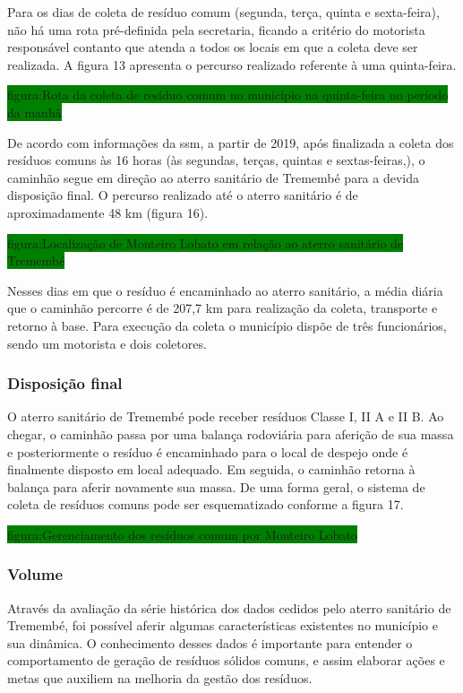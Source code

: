 	Para os dias de coleta de resíduo comum (segunda, terça, quinta e sexta-feira), não há uma rota pré-definida pela secretaria, ficando a critério do motorista responsável contanto que atenda a todos os locais em que a coleta deve ser realizada. A figura 13 apresenta o percurso realizado referente à uma quinta-feira.
	
	\colorbox{green}{figura:Rota da coleta de resíduo comum no município na quinta-feira no período da manhã}
	
	De acordo com informações da \gls{ssm}, a partir de 2019, após finalizada a coleta dos resíduos comuns às 16 horas (às segundas, terças, quintas e sextas-feiras,), o caminhão segue em direção ao aterro sanitário de Tremembé para a devida disposição final. O percurso realizado até o aterro sanitário é de aproximadamente 48 km (figura 16).
	
	\colorbox{green}{figura:Localização de Monteiro Lobato em relação ao aterro sanitário de Tremembé}
	
	Nesses dias em que o resíduo é encaminhado ao aterro sanitário, a média diária que o caminhão percorre é de 207,7 km para realização da coleta, transporte e retorno à base. Para execução da coleta o município dispõe de três funcionários, sendo um motorista e dois coletores.
	
	\subsubsection{Disposição final}
	
	O aterro sanitário de Tremembé pode receber resíduos Classe I, II A e II B. Ao chegar, o caminhão passa por uma balança rodoviária para aferição de sua massa e posteriormente o resíduo é encaminhado para o local de despejo onde é finalmente disposto em local adequado. Em seguida, o caminhão retorna à balança para aferir novamente sua massa.
	De uma forma geral, o sistema de coleta de resíduos comuns pode ser esquematizado conforme a figura 17.
	
	\colorbox{green}{figura:Gerenciamento dos resíduos comum por Monteiro Lobato}
	
	\subsubsection{Volume}
	
	Através da avaliação da série histórica dos dados cedidos pelo aterro sanitário de Tremembé, foi possível aferir algumas características existentes no município e sua dinâmica. O conhecimento desses dados é importante para entender o comportamento de geração de resíduos sólidos comuns, e assim elaborar ações e metas que auxiliem na melhoria da gestão dos resíduos.
	
